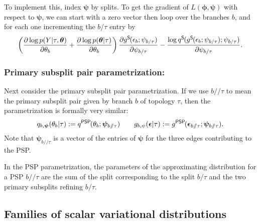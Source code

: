 \documentclass{article}
\newcommand{\psp}{\slash\!\!\slash}
\newcommand{\qSplit}{q^\textsf{S}\hspace{-1pt}}
\newcommand{\gSplit}{g^\textsf{S}\hspace{-1pt}}
\newcommand{\qPSP}{q^\textsf{PSP}\hspace{-1pt}}
\newcommand{\gPSP}{g^\textsf{PSP}\hspace{-1pt}}
\begin{document}
To implement this, index $\bm\psi$ by splits.
To get the gradient of $L(\bm\phi, \bm\psi)$ with respect to $\bm\psi$, we can start with a zero vector then loop over the branches $b$, and for each one incrementing the $b \slash \tau$ entry by
\begin{equation*}
    \left(
        \frac{\partial \log p(Y | \tau, \bm\theta)}{\partial \theta_b}
        +
        \frac{\partial \log p(\bm\theta | \tau)}{\partial \theta_b}
    \right)
    \frac{\partial \gSplit(\epsilon_b; \psi_{b \slash \tau})}{\partial \psi_{b \slash \tau}}
    - \frac{\log \qSplit(\gSplit(\epsilon_b; \psi_{b \slash \tau}); \psi_{b \slash \tau})}{\partial \psi_{b \slash \tau}}.
\end{equation*}


\subsubsection*{Primary subsplit pair parametrization:}
Next consider the primary subsplit pair parametrization.
If we use $b \psp \tau$ to mean the primary subsplit pair given by branch $b$ of topology $\tau$, then the parametrization is formally very similar:
\[
q_{b, \bm{\psi}}(\theta_b | \tau) := \qPSP(\theta_b; \bm\psi_{b \psp \tau})
\qquad
g_{b,\psi}(\bm\epsilon | \tau) := \gPSP(\bm\epsilon_{b \psp \tau}; \bm\psi_{b \psp \tau}).
\]
Note that $\bm\psi_{b \psp \tau}$ is a vector of the entries of $\bm\psi$ for the three edges contributing to the PSP.

In the PSP parametrization, the parameters of the approximating distribution for a PSP $b \psp \tau$ are the sum of the split corresponding to the split $b \slash \tau$ and the two primary subsplits refining $b \slash \tau$.

\subsection*{Families of scalar variational distributions}
\end{document}
